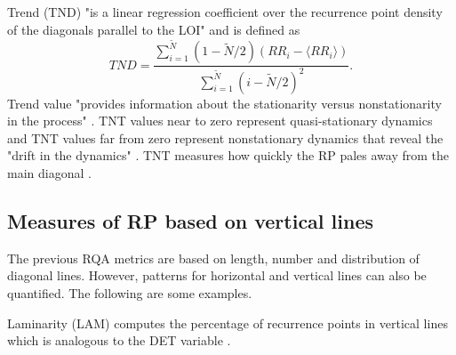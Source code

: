 Trend (TND) "is a linear regression coefficient over the recurrence point 
density of the diagonals parallel to the LOI" \citep[p. 16]{marwan2015} 
and is defined as
\begin{equation}
TND= \frac{ \sum^{\tilde{N} }_{i=1}  (1- \tilde{N} /2 )( RR_i - \langle RR_i  \rangle )  }{  \sum^{\tilde{N} }_{i=1}  (i-\tilde{N} /2)^2  }.
\end{equation}
Trend value "provides information about the stationarity versus nonstationarity 
in the process" \citep[p. 16]{marwan2015}. TNT values near to zero represent 
quasi-stationary dynamics and TNT values far from zero represent nonstationary 
dynamics that reveal the "drift in the dynamics" \cite[p. 16]{marwan2015}. 
TNT measures how quickly the RP pales away from the main diagonal 
\citep{iwanski1998}.
%  


\subsection{Measures of RP based on vertical lines}
The previous RQA metrics are based on length, number and distribution of 
diagonal lines. However, patterns for horizontal and vertical lines can also 
be quantified. The following are some examples.

Laminarity (LAM) computes the percentage of recurrence points in vertical lines
which is analogous to the DET variable \cite{marwan2015}.
 

